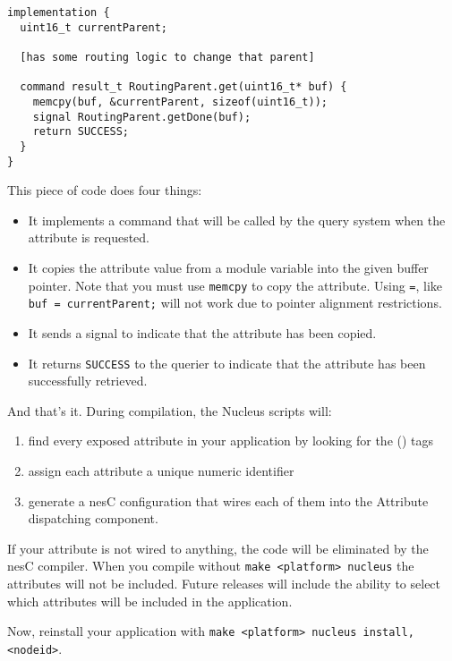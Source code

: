 \documentclass{article}
\begin{document}
\begin{enumerate}
\begin{verbatim}
implementation {
  uint16_t currentParent;

  [has some routing logic to change that parent]

  command result_t RoutingParent.get(uint16_t* buf) {             
    memcpy(buf, &currentParent, sizeof(uint16_t));
    signal RoutingParent.getDone(buf);
    return SUCCESS;
  }
}
\end{verbatim}

This piece of code does four things:

\begin{itemize}
\item It implements a command that will be called by the query system
when the attribute is requested.
\item It copies the attribute value from a module variable into the
given buffer pointer. Note that you must use {\tt memcpy} to copy the attribute. Using {\tt =}, like {\tt *buf = currentParent;} will not work due to pointer alignment restrictions.
\item It sends a signal to indicate that the attribute has been
copied.
\item It returns {\tt SUCCESS} to the querier to indicate that the
attribute has been successfully retrieved.
\end{itemize}

\end{enumerate}

And that's it. During compilation, the Nucleus scripts will:

\begin{enumerate}
\item find every
exposed attribute in your application by looking for the
{\tt@nucleusAttr()} tags
\item assign each attribute a unique numeric identifier
\item generate a nesC configuration that wires each of them into the
Attribute dispatching component.
\end{enumerate}

If your attribute is not wired to anything, the code will be
eliminated by the nesC compiler. When you compile without {\tt make
<platform> nucleus} the attributes will not be included. Future
releases will include the ability to select which attributes will be
included in the application.

Now, reinstall your application with {\tt make <platform> nucleus
install,<nodeid>}.
\end{document}
